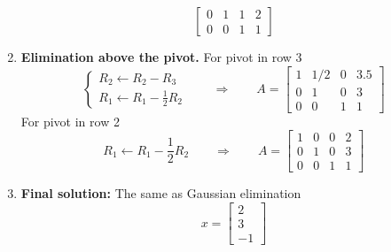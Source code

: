 \documentclass[../../../main.tex]{subfiles}
\begin{document}
\begin{enumerate}
\begin{equation*}
\begin{bmatrix}
                  0 & 1   & 1    & 2 \\
                  0 & 0   & 1    & 1
              \end{bmatrix}
          \end{equation*}
    \item \textbf{Elimination above the pivot.}
          For pivot in row 3
          \begin{equation*}
              \begin{cases}
                  R_2\leftarrow R_2-R_3 \\
                  R_1\leftarrow R_1-\frac{1 }{2}R_2
              \end{cases}
              \qquad \Rightarrow \qquad
              A=
              \begin{bmatrix}
                  1 & 1/2 & 0 & 3.5 \\
                  0 & 1   & 0 & 3   \\
                  0 & 0   & 1 & 1
              \end{bmatrix}
          \end{equation*}
          For pivot in row 2
          \begin{equation*}
              R_1 \leftarrow R_1-\frac{1 }{2 }R_2
              \qquad \Rightarrow \qquad
              A=
              \begin{bmatrix}
                  1 & 0 & 0 & 2 \\
                  0 & 1 & 0 & 3 \\
                  0 & 0 & 1 & 1
              \end{bmatrix}
          \end{equation*}
    \item \textbf{Final solution:} The same as Gaussian elimination
          \begin{equation*}
              x =
              \begin{bmatrix}
                  2 \\ 3 \\ -1
              \end{bmatrix}
          \end{equation*}
\end{enumerate}
\end{document}
